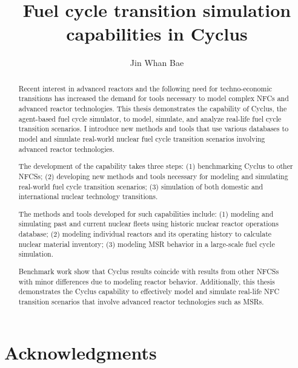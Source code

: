 \documentclass{report}
\begin{document}
\title{Fuel cycle transition simulation capabilities in Cyclus}
\author{Jin Whan Bae}
\maketitle


\begin{abstract}
Recent interest in advanced reactors and the following need for techno-economic
transitions has increased the demand for tools necessary
to model complex \glspl{NFC} and advanced reactor technologies.
This thesis demonstrates the capability of Cyclus, the
agent-based fuel cycle simulator, to model, simulate, and analyze
real-life fuel cycle transition scenarios. I introduce new methods
and tools that use various databases to model and simulate real-world
nuclear fuel cycle transition scenarios involving advanced reactor
technologies.

The development of the capability takes
three steps: (1) benchmarking
Cyclus to other \glspl{NFCS};
(2) developing new methods and tools necessary for modeling and simulating
real-world fuel cycle transition scenarios; (3)
simulation of both domestic and international nuclear technology
transitions.

The methods and tools developed for such capabilities include:
(1) modeling and simulating past and current
nuclear fleets using historic nuclear reactor operations
database; (2) modeling individual reactors and its operating history
to calculate nuclear material inventory; (3) modeling \gls{MSR} behavior
in a large-scale fuel cycle simulation.

Benchmark work show that Cyclus results coincide
with results from other \glspl{NFCS} with minor differences
due to modeling reactor behavior.
Additionally, this thesis demonstrates the Cyclus capability to effectively
model and simulate real-life \gls{NFC} transition scenarios
that involve advanced reactor technologies such as \glspl{MSR}.

\end{abstract}

\chapter*{Acknowledgments}
\end{document}
